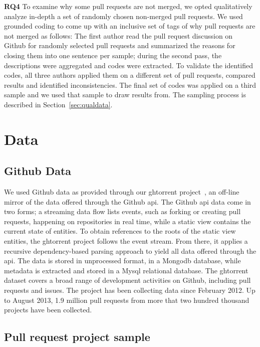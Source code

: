 \documentclass{sig-alternate}
\begin{document}
{\bfseries RQ4} To examine why some pull requests are not merged, we opted
qualitatively analyze in-depth a set of randomly chosen non-merged
pull requests. We used grounded coding to come up with an inclusive set of tags
of why pull requests are not merged as follows: The first author read the pull
request discussion on Github for randomly selected pull requests and summarized
the reasons for closing them into one sentence per sample; during the second
pass, the descriptions were aggregated and codes were extracted. To validate the
identified codes, all three authors applied them on a different set of pull
requests, compared results and identified inconsistencies.  The final set of
codes was applied on a third sample and we used that sample to draw results
from. The sampling process is described in Section~\ref{sec:qualdata}.

\section{Data}

\subsection{Github Data}
\label{sec:ghtorrent}

We used Github data as provided through our {\sc ght}orrent project~\cite{G13},
an off-line mirror of the data
offered through the Github {\sc api}. The Github {\sc api} 
data come in two forms; a streaming
data flow lists events, such as forking or creating pull requests, happening on
repositories in real time, while a static view contains the current state of
entities. To obtain references to the roots of the static view entities, the
{\sc ght}orrent project follows the event stream. From there, it applies a
recursive dependency-based parsing approach to yield all data offered through
the {\sc api}. The data is stored in unprocessed format, in a Mongo{\sc db}
database, while metadata is extracted and stored in a My{\sc sql} relational
database. The {\sc ght}orrent dataset covers a broad range of development
activities on Github, including pull requests and issues. The project
has been collecting data since February 2012. Up to August 2013,
1.9 million pull requests from more that two hundred thousand projects
have been collected.

\subsection{Pull request project sample}
\label{sec:expdata} 
\end{document}
